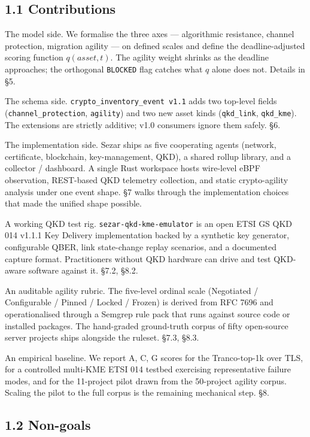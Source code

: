 \subsection{1.1 Contributions}\label{contributions}

The model side. We formalise the three axes --- algorithmic resistance,
channel protection, migration agility --- on defined scales and define
the deadline-adjusted scoring function \(q(\mathit{asset}, t)\). The
agility weight shrinks as the deadline approaches; the orthogonal
\texttt{BLOCKED} flag catches what \(q\) alone does not. Details in §5.

The schema side. \texttt{crypto\_inventory\_event\ v1.1} adds two
top-level fields (\texttt{channel\_protection}, \texttt{agility}) and
two new asset kinds (\texttt{qkd\_link}, \texttt{qkd\_kme}). The
extensions are strictly additive; v1.0 consumers ignore them safely. §6.

The implementation side. Sezar ships as five cooperating agents
(network, certificate, blockchain, key-management, QKD), a shared rollup
library, and a collector / dashboard. A single Rust workspace hosts
wire-level eBPF observation, REST-based QKD telemetry collection, and
static crypto-agility analysis under one event shape. §7 walks through
the implementation choices that made the unified shape possible.

A working QKD test rig. \texttt{sezar-qkd-kme-emulator} is an open ETSI
GS QKD 014 v1.1.1 Key Delivery implementation backed by a synthetic key
generator, configurable QBER, link state-change replay scenarios, and a
documented capture format. Practitioners without QKD hardware can drive
and test QKD-aware software against it. §7.2, §8.2.

An auditable agility rubric. The five-level ordinal scale (Negotiated /
Configurable / Pinned / Locked / Frozen) is derived from RFC 7696 and
operationalised through a Semgrep rule pack that runs against source
code or installed packages. The hand-graded ground-truth corpus of fifty
open-source server projects ships alongside the ruleset. §7.3, §8.3.

An empirical baseline. We report A, C, G scores for the Tranco-top-1k
over TLS, for a controlled multi-KME ETSI 014 testbed exercising
representative failure modes, and for the 11-project pilot drawn from
the 50-project agility corpus. Scaling the pilot to the full corpus is
the remaining mechanical step. §8.

\subsection{1.2 Non-goals}\label{non-goals}


